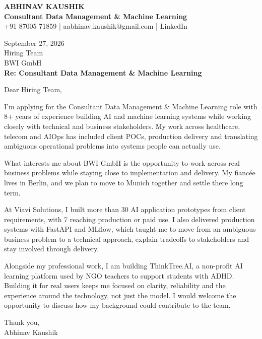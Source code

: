 \documentclass[10pt,a4paper]{article}
\begin{document}
\begin{center}
{\Large\bfseries ABHINAV KAUSHIK}\\[2pt]
{\bfseries Consultant Data Management \& Machine Learning}\\[2pt]
+91 87005 71859 \quad | \quad aabhinav.kaushik@gmail.com \quad | \quad LinkedIn
\end{center}
\vspace{8pt}
September 27, 2026\\[6pt]
Hiring Team\\
BWI GmbH\\[4pt]
\textbf{Re: Consultant Data Management \& Machine Learning}

Dear Hiring Team,

I’m applying for the Consultant Data Management \& Machine Learning role with 8+ years of experience building AI and machine learning systems while working closely with technical and business stakeholders. My work across healthcare, telecom and AIOps has included client POCs, production delivery and translating ambiguous operational problems into systems people can actually use.

What interests me about BWI GmbH is the opportunity to work across real business problems while staying close to implementation and delivery. My fiancée lives in Berlin, and we plan to move to Munich together and settle there long term.

At Viavi Solutions, I built more than 30 AI application prototypes from client requirements, with 7 reaching production or paid use. I also delivered production systems with FastAPI and MLflow, which taught me to move from an ambiguous business problem to a technical approach, explain tradeoffs to stakeholders and stay involved through delivery.

Alongside my professional work, I am building ThinkTree.AI, a non-profit AI learning platform used by NGO teachers to support students with ADHD. Building it for real users keeps me focused on clarity, reliability and the experience around the technology, not just the model. I would welcome the opportunity to discuss how my background could contribute to the team.

Thank you,\\
Abhinav Kaushik
\end{document}
